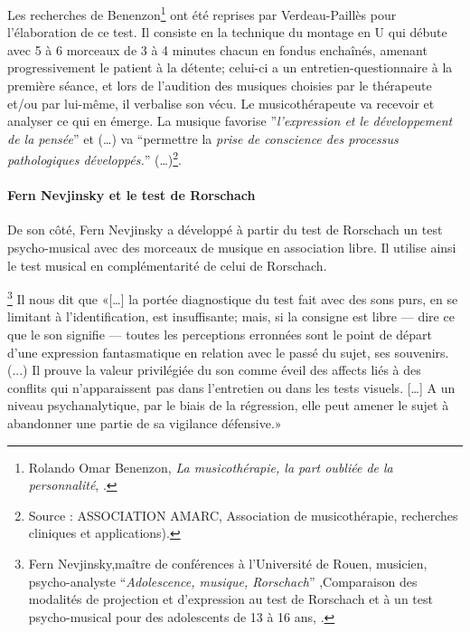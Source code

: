 Les recherches de Benenzon\footnote{Rolando Omar
  Benenzon, \emph{La musicothérapie, la part oubliée de la
    personnalité}, \cite{Benenzon2007}.} ont été reprises par
Verdeau-Paillès pour l'élaboration de ce test. Il consiste en la technique du montage en U qui débute avec 5 à 6 morceaux de 3 à 4 minutes chacun en fondus enchaînés, amenant progressivement le patient à la détente; celui-ci a un entretien-questionnaire à la première
séance, et lors de l'audition des musiques choisies par le thérapeute
et/ou par lui-même, il  verbalise son vécu. Le musicothérapeute
va recevoir et analyser ce qui en émerge. 
La musique favorise  ''\emph{l'expression et le développement
	de la pensée}'' et (\ldots) va ``permettre la \emph{prise de conscience
	des processus pathologiques développés.}''
  (\ldots)\footnote{Source : ASSOCIATION AMARC,
  Association de musicothérapie, recherches cliniques et
  applications). }.


 \paragraph{Fern Nevjinsky et le test de Rorschach}
 De son côté, Fern Nevjinsky a développé à partir du  test de Rorschach un test psycho-musical avec des morceaux
de musique en association libre. Il utilise ainsi le test
musical en complémentarité de celui de Rorschach.

 
\footnote{Fern Nevjinsky,maître de conférences à l'Université de Rouen, musicien, psycho-analyste ``\emph{Adolescence, musique, Rorschach}'' ,Comparaison des modalités de projection et d'expression au test de Rorschach et à un test psycho-musical pour des adolescents de 13 à 16 ans,
  \cite{Nevjinsky1996}.} Il nous dit  que  «[\ldots] la
portée diagnostique du test fait avec des sons purs, en se limitant à
l'identification, est insuffisante; mais, si la consigne est libre ---
dire ce que le son signifie --- toutes les perceptions erronnées sont
le point de départ d'une expression fantasmatique en relation avec le
passé du sujet, ses souvenirs. (...) Il prouve  la valeur privilégiée du son comme éveil
des affects liés à des conflits qui n'apparaissent pas dans
l'entretien ou dans les tests visuels.  [\ldots] A un niveau
psychanalytique, par le biais de la régression, elle peut amener le sujet à abandonner une partie de sa vigilance défensive.»

